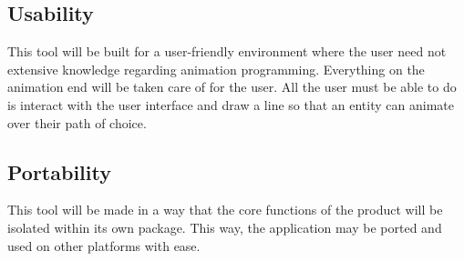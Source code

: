 \subsection{Usability}
This tool will be built for a user-friendly environment where the user need not extensive knowledge regarding animation programming. Everything on the animation end will be taken care of for the user. All the user must be able to do is interact with the user interface and draw a line so that an entity can animate over their path of choice.

\subsection{Portability}
This tool will be made in a way that the core functions of the product will be isolated within its own package. This way, the application may be ported and used on other platforms with ease.
